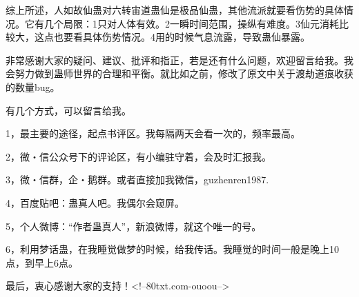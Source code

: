 \begin{this_body}
综上所述，人如故仙蛊对六转宙道蛊仙是极品仙蛊，其他流派就要看伤势的具体情况。它有几个局限：1只对人体有效。2一瞬时间范围，操纵有难度。3仙元消耗比较大，这点也要看具体伤势情况。4用的时候气息流露，导致蛊仙暴露。

非常感谢大家的疑问、建议、批评和指正，若是还有什么问题，欢迎留言给我。我会努力做到蛊师世界的合理和平衡。就比如之前，修改了原文中关于渡劫道痕收获的数量bug。

有几个方式，可以留言给我。

1，最主要的途径，起点书评区。我每隔两天会看一次的，频率最高。

2，微・信公众号下的评论区，有小编驻守着，会及时汇报我。

3，微・信群，企・鹅群。或者直接加我微信，guzhenren1987.

4，百度贴吧：蛊真人吧。我偶尔会窥屏。

5，个人微博：“作者蛊真人”，新浪微博，就这个唯一的号。

6，利用梦话蛊，在我睡觉做梦的时候，给我传话。我睡觉的时间一般是晚上10点，到早上6点。

最后，衷心感谢大家的支持！<!--80txt.com-ouoou-->

\end{this_body}

